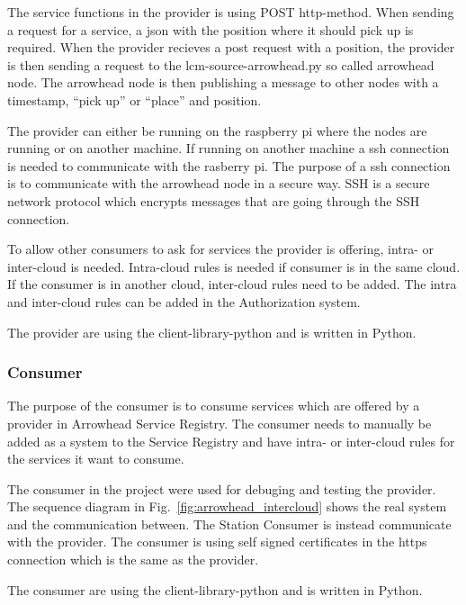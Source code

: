 The service functions in the provider is using POST http-method.
When sending a request for a service, a json with the position where it should pick up is required.
When the provider recieves a post request with a position, the provider is then sending a request to the lcm-source-arrowhead.py so called arrowhead node.
The arrowhead node is then publishing a message to other nodes with a timestamp, ``pick up'' or ``place'' and position.

The provider can either be running on the raspberry pi where the nodes are running or on another machine.
If running on another machine a ssh connection is needed to communicate with the rasberry pi.
The purpose of a ssh connection is to communicate with the arrowhead node in a secure way.
SSH is a secure network protocol which encrypts messages that are going through the SSH connection.

To allow other consumers to ask for services the provider is offering, intra- or inter-cloud is needed.
Intra-cloud rules is needed if consumer is in the same cloud.
If the consumer is in another cloud, inter-cloud rules need to be added.
The intra and inter-cloud rules can be added in the Authorization system.

The provider are using the client-library-python and is written in Python.

\subsubsection{Consumer}
The purpose of the consumer is to consume services which are offered by a provider in Arrowhead Service Registry.
The consumer needs to manually be added as a system to the Service Registry and have intra- or inter-cloud rules for the services it want to consume.

The consumer in the project were used for debuging and testing the provider. The sequence diagram in Fig.~\ref{fig:arrowhead_intercloud} shows the real system and the communication between. The Station Consumer is instead communicate with the provider.
The consumer is using self signed certificates in the https connection which is the same as the provider.

The consumer are using the client-library-python and is written in Python.
